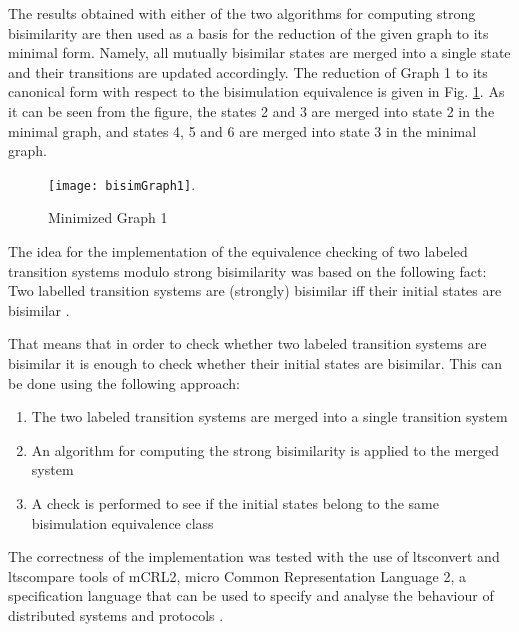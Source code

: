 The results obtained with either of the two algorithms for computing strong bisimilarity are then used as a basis for the reduction of the given graph to its minimal form. Namely, all mutually bisimilar states are merged into a single state and their transitions are updated accordingly. The reduction of Graph 1 to its canonical form with respect to the bisimulation equivalence is given in Fig.  \ref{fig:bisimGraph1}. As it can be seen from the figure, the states 2 and 3 are merged into state 2 in the minimal graph, and states 4, 5 and 6 are merged into state 3 in the minimal graph.

\begin{figure}[!ht]
\centering
\texttt{[image: bisimGraph1]}.
\caption{Minimized Graph 1}
\label{fig:bisimGraph1}
\end{figure}

The idea for the implementation of the equivalence checking of two labeled transition systems modulo strong bisimilarity was based on the following fact: Two labelled transition systems are (strongly) bisimilar iff their initial states are bisimilar \cite{ModellingAndAnalysis}.

That means that in order to check whether two labeled transition systems are bisimilar it is enough to check whether their initial states are bisimilar. This can be done using the following approach:
\begin{enumerate}
	\item The two labeled transition systems are merged into a single transition system
	\item An algorithm for computing the strong bisimilarity is applied to the merged system
	\item A check is performed to see if the initial states belong to the same bisimulation equivalence class
\end{enumerate}

The correctness of the implementation was tested with the use of ltsconvert and ltscompare tools of mCRL2, micro Common Representation Language 2, a specification language that can be used to specify and analyse the behaviour of distributed systems and protocols
\cite{mCRL2Ref}.
